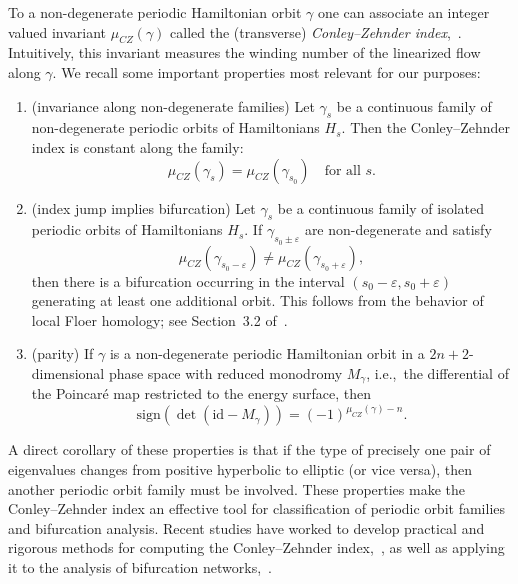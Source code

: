 \documentclass[pdflatex,sn-mathphys-ay]{sn-jnl}%
\theoremstyle{thmstyleone}%
\theoremstyle{thmstyletwo}%
\theoremstyle{thmstylethree}%
\renewcommand{\epsilon}{\varepsilon}
\newcommand{\id}{\mathrm{id}}
\begin{document}
To a non-degenerate periodic Hamiltonian orbit $\gamma$ one can associate an integer valued invariant $\mu_{CZ}(\gamma)$ called the (transverse) \emph{Conley--Zehnder index},~\cite{conley_morse_1984, salamon_zehnder_1992, Cieliebak_action}.  
Intuitively, this invariant measures the winding number of the linearized flow along $\gamma$. 
We recall some important properties most relevant for our purposes:
\begin{enumerate}
    \item (invariance along non-degenerate families)
    Let $\gamma_s$ be a continuous family of non-degenerate periodic orbits of Hamiltonians $H_s$.
    Then the Conley--Zehnder index is constant along the family:
    \[
    \mu_{CZ}(\gamma_s) = \mu_{CZ}(\gamma_{s_0}) \quad \text{for all } s.
    \] \label{itm:cz-invariance}
    \item (index jump implies bifurcation)
    Let $\gamma_s$ be a continuous family of isolated periodic orbits of Hamiltonians $H_s$.  
    If $\gamma_{s_0 \pm \epsilon}$ are non-degenerate and satisfy
    \[
    \mu_{CZ}(\gamma_{s_0 - \epsilon}) \neq \mu_{CZ}(\gamma_{s_0 + \epsilon}),
    \]
    then there is a bifurcation occurring in the interval $(s_0-\epsilon,s_0+\epsilon)$ generating at least one additional orbit.  
    This follows from the behavior of local Floer homology; see Section~3.2 of~\cite{Ginzburg_Conley_conjecture}.
    \item (parity) If $\gamma$ is a non-degenerate periodic Hamiltonian orbit in a $2n+2$-dimensional phase space with reduced monodromy $M_\gamma$, i.e.,~the differential of the Poincar\'e map restricted to the energy surface, then
    $$
    \text{sign}(\det(\id -M_\gamma))=(-1)^{\mu_{CZ}(\gamma)-n}.
    $$
    
\end{enumerate}
A direct corollary of these properties is that if the type of precisely one pair of eigenvalues changes from positive hyperbolic to elliptic (or vice versa), then another periodic orbit family must be involved.
These properties make the Conley--Zehnder index an effective tool for classification of periodic orbit families and bifurcation analysis. 
Recent studies have worked to develop practical and rigorous methods for computing the Conley--Zehnder index,~\cite{moreno_aydin_van_Koert_Frauenfelder_Koh_Bifurcation_Graphs_2024,joung_van_koert_computational_2025}, as well as applying it to the analysis of bifurcation networks,~\cite{aydin_Batkhin_hill_2025,aydin_dro_2025}.
\end{document}
